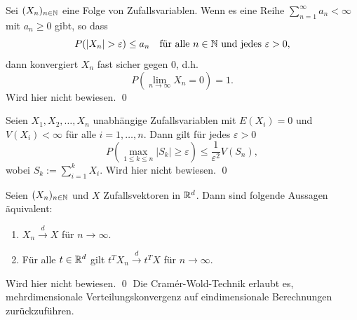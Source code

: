 \begin{lemma}
Sei $(X_n)_{n \in \Bbb N}$ eine Folge von Zufallsvariablen. Wenn es eine Reihe $\sum_{n=1}^\infty a_n \lt \infty$ mit $a_n \geq 0$ gibt, so dass
$$P(|X_n| > \varepsilon) \leq a_n \quad \text{für alle } n \in \Bbb N \text{ und jedes } \varepsilon > 0,$$
dann konvergiert $X_n$ fast sicher gegen $0$, d.h.
$$P\left(\lim_{n \to \infty} X_n = 0\right) = 1.$$
Wird hier nicht bewiesen. \qed
\end{lemma}

\begin{satz}
Seien $X_1, X_2, \ldots, X_n$ unabhängige Zufallsvariablen mit $E(X_i) = 0$ und $V(X_i) < \infty$ für alle $i=1, \ldots, n$. Dann gilt für jedes $\varepsilon > 0$
$$P\left(\max_{1 \leq k \leq n} |S_k| \geq \varepsilon \right) \leq \frac{1}{\varepsilon^2} V(S_n),$$
wobei $S_k := \sum_{i=1}^k X_i$. Wird hier nicht bewiesen. \qed
\end{satz}

\begin{satz}
Seien $(X_n)_{n \in \Bbb N}$ und $X$ Zufallsvektoren in $\Bbb R^d$. Dann sind folgende Aussagen äquivalent:
\begin{enumerate}
    \item $X_n \xrightarrow{d} X$ für $n \to \infty$.
    \item Für alle $t \in \Bbb R^d$ gilt $t^T X_n \xrightarrow{d} t^T X$ für $n \to \infty$.
\end{enumerate}
Wird hier nicht bewiesen. \qed
Die Cramér-Wold-Technik erlaubt es, mehrdimensionale Verteilungskonvergenz auf eindimensionale Berechnungen zurückzuführen.
\end{satz}

